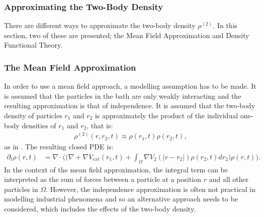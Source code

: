 \subsubsection{Approximating the Two-Body Density}
There are different ways to approximate the two-body density $\rho^{(2)}$. In this section, two of these are presented; the Mean Field Approximation and Density Functional Theory.
\subsubsection*{The Mean Field Approximation}
In order to use a mean field approach, a modelling assumption has to be made. It is assumed that the particles in the bath are only weakly interacting and the resulting approximation is that of independence. It is assumed that the two-body density of particles $r_1$ and $r_2$ is approximately the product of the individual one-body densities of $r_1$ and $r_2$, that is:
\begin{align*}
\rho^{(2)}(r,r_2,t)\approx \rho(r_1,t)\rho(r_2,t),
\end{align*}
as in \cite{RexLoewen1}.
The resulting closed PDE is:
\begin{align}\label{eqnMeanFieldApprox1}
\partial_t \rho(r,t) &=
\nabla\cdot \bigg( \bigg(\nabla 
+ \nabla V_{ext}(r_1,t) 
+\int_\Omega  \nabla  V_2(|r - r_2|) \rho(r_2,t) dr_2 \bigg) \rho(r,t) \bigg).
\end{align}
In the context of the mean field approximation, the integral term can be interpreted as the sum of forces between a particle at a position $r$ and all other particles in $\Omega$.
However, the independence approximation is often not practical in modelling industrial phenomena and so an alternative approach needs to be considered, which includes the effects of the two-body density.
